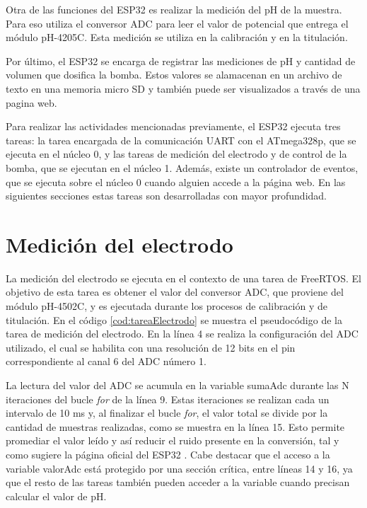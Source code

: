 Otra de las funciones del ESP32 es realizar la medición del pH de la muestra. Para eso utiliza el conversor ADC para leer el valor de potencial que entrega el módulo pH-4205C. Esta medición se utiliza en la calibración y en la titulación.

Por último, el ESP32 se encarga de registrar las mediciones de pH y cantidad de volumen que dosifica la bomba. Estos valores se alamacenan en un archivo de texto en una memoria micro SD y también puede ser visualizados a través de una pagina web.

Para realizar las actividades mencionadas previamente, el ESP32 ejecuta tres tareas: la tarea encargada de la comunicación UART con el ATmega328p, que se ejecuta en el núcleo 0, y las tareas de medición del electrodo y de control de la bomba, que se ejecutan en el núcleo 1. Además, existe un controlador de eventos, que se ejecuta sobre el núcleo 0 cuando alguien accede a la página web.
En las siguientes secciones estas tareas son desarrolladas con mayor profundidad.

\section{Medición del electrodo}

La medición del electrodo se ejecuta en el contexto de una tarea de FreeRTOS. El objetivo de esta tarea es obtener el valor del conversor ADC, que proviene del módulo pH-4502C, y es ejecutada durante los procesos de calibración y de titulación. En el código \ref{cod:tareaElectrodo} se muestra el pseudocódigo de la tarea de medición del electrodo. En la línea 4 se realiza la configuración del ADC utilizado, el cual se habilita con una resolución de 12 bits en el pin correspondiente al canal 6 del ADC número 1.

La lectura del valor del ADC se acumula en la variable sumaAdc durante las N iteraciones del bucle \textit{for} de la línea 9. Estas iteraciones se realizan cada un intervalo de 10 ms y, al finalizar el bucle \textit{for}, el valor total se divide por la cantidad de muestras realizadas, como se muestra en la línea 15. Esto permite promediar el valor leído y así reducir el ruido presente en la conversión, tal y como sugiere la página oficial del ESP32 \citep{WEBSITE:2}. Cabe destacar que el acceso a la variable valorAdc está protegido por una sección crítica, entre líneas 14 y 16, ya que el resto de las tareas también pueden acceder a la variable cuando precisan calcular el valor de pH.

